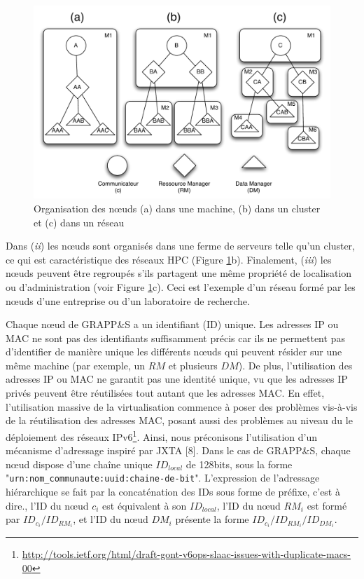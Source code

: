 \begin{figure}
	\centering
	\includegraphics[width=0.85\linewidth]{img/noeuds.pdf} 
	\caption{Organisation des n{\oe}uds (a) dans une machine, (b) dans un cluster et (c) dans un réseau\label{fig:noeuds}}
\end{figure}

Dans (\textit{ii}) les n{\oe}uds sont organisés dans une ferme de serveurs telle qu'un cluster, ce qui est caractéristique des réseaux HPC (Figure \ref{fig:noeuds}b). Finalement, (\textit{iii}) les n{\oe}uds peuvent être regroupés s'ils partagent une même propriété de localisation ou d'administration (voir Figure \ref{fig:noeuds}c). Ceci est l'exemple d'un réseau formé par les n{\oe}uds d'une entreprise ou d'un laboratoire de recherche. 

Chaque n{\oe}ud de GRAPP\&S a un identifiant (ID) unique. Les adresses IP ou MAC ne sont pas des identifiants suffisamment précis car ils ne permettent pas d'identifier de manière unique les différents n{\oe}uds qui peuvent résider sur une même machine (par exemple, un $RM$ et plusieurs $DM$). De plus, l'utilisation des adresses IP ou MAC ne garantit pas une identité unique, vu que les adresses IP privés peuvent être réutilisées tout autant que les adresses MAC. En effet, l'utilisation massive de la virtualisation commence à poser des problèmes vis-à-vis de la réutilisation des adresses MAC, posant aussi des problèmes au niveau du le déploiement des réseaux IPv6\footnote{\url{http://tools.ietf.org/html/draft-gont-v6ops-slaac-issues-with-duplicate-macs-00}}. Ainsi, nous préconisons l'utilisation d'un mécanisme d'adressage inspiré par JXTA [8]. Dans le cas de GRAPP\&S, chaque n{\oe}ud dispose d'une chaîne unique $ID_{local}$ de 128bits, sous la forme "\texttt{urn:nom\_communaute:uuid:chaine-de-bit}". L'expression de l'adressage hiérarchique se fait par la concaténation des IDs sous forme de préfixe, c'est à dire., l'ID du n{\oe}ud $c_i$ est équivalent à son $ID_{local}$, l'ID du n{\oe}ud $RM_i$ est formé par $ID_{c_i}/ID_{RM_i}$, et l'ID du n{\oe}ud $DM_i$ présente la forme $ID_{c_i}/ID_{RM_i}/ID_{DM_i}$.

